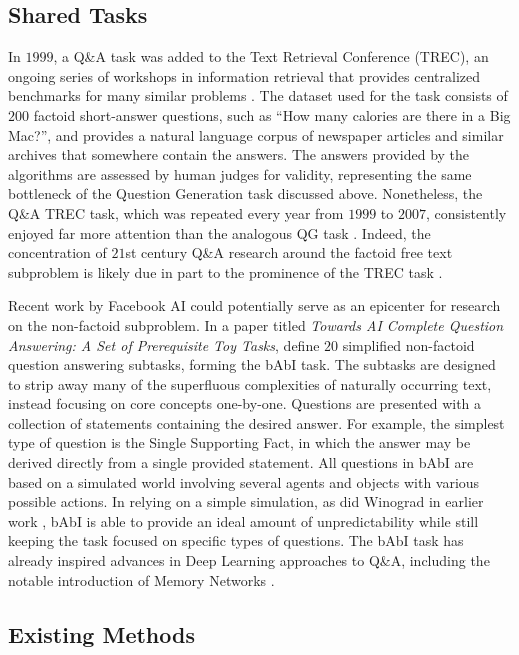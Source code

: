 \subsection{Shared Tasks}

In $1999$, a Q\&A task was added to the Text Retrieval Conference (TREC), an ongoing series of workshops in information retrieval that provides centralized benchmarks for many similar problems \citep{voorhees1999trec}. The dataset used for the task consists of $200$ factoid short-answer questions, such as ``How many calories are there in a Big Mac?'', and provides a natural language corpus of newspaper articles and similar archives that somewhere contain the answers. The answers provided by the algorithms are assessed by human judges for validity, representing the same bottleneck of the Question Generation task discussed above. Nonetheless, the Q\&A TREC task, which was repeated every year from $1999$ to $2007$, consistently enjoyed far more attention than the analogous QG task \citep{dang2007overview}. Indeed, the concentration of $21$st century Q\&A research around the factoid free text subproblem is likely due in part to the prominence of the TREC task \citep{hirschman2001natural}.

Recent work by Facebook AI could potentially serve as an epicenter for research on the non-factoid subproblem. In a paper titled \textit{Towards AI Complete Question Answering: A Set of Prerequisite Toy Tasks}, \citet{weston2015towards} define $20$ simplified non-factoid question answering subtasks, forming the bAbI task. The subtasks are designed to strip away many of the superfluous complexities of naturally occurring text, instead focusing on core concepts one-by-one. Questions are presented with a collection of statements containing the desired answer. For example, the simplest type of question is the Single Supporting Fact, in which the answer may be derived directly from a single provided statement. All questions in bAbI are based on a simulated world involving several agents and objects with various possible actions. In relying on a simple simulation, as did Winograd in earlier work \citep{winograd1971procedures}, bAbI is able to provide an ideal amount of unpredictability while still keeping the task focused on specific types of questions. The bAbI task has already inspired advances in Deep Learning approaches to Q\&A, including the notable introduction of Memory Networks \citep{sukhbaatar2015weakly}.

\subsection{Existing Methods}

